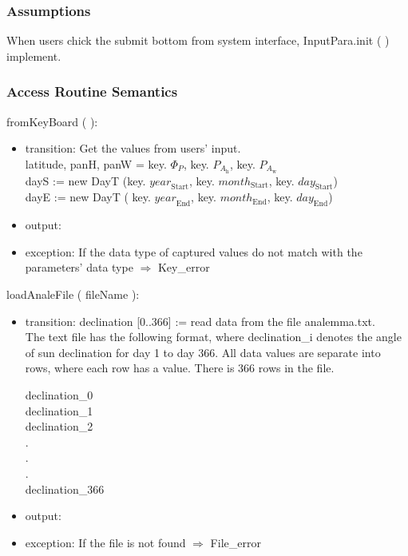 \documentclass[12pt, titlepage]{article}
\begin{document}
\subsubsection{Assumptions}
When users chick the submit bottom from system interface, InputPara.init ( ) implement.

\subsubsection{ Access Routine Semantics}

\noindent  fromKeyBoard ( ):
\begin{itemize}
\item transition: Get the values from users' input.\\
latitude, panH, panW = key. $\Phi_P$, key. $P_{A_{\text{h}}}$, key. $P_{A_{\text{w}}}$\\

dayS := new DayT (key. $\mathit{year}_\text{Start}$, key. $\mathit{month}_\text{Start}$, key. $\mathit{day}_\text{Start}$) \\

dayE :=  new DayT ( key. $\mathit{year}_\text{End}$, key. $\mathit{month}_\text{End}$, key. $\mathit{day}_\text{End}$)\\
\item output:
\item exception: If the data type of captured values do not match with the parameters' data type $\Rightarrow$ Key\_error
\end{itemize}



\noindent  loadAnaleFile ( fileName ):
\begin{itemize}
\item transition: declination [0..366] := read data from the file analemma.txt.\\
The text file has the following format, where declination\_i denotes the angle of sun declination for day 1 to day 366.
All data values are separate into rows, where each row has a value. There is 366 rows in the file.
\begin{center}
declination\_0\\
declination\_1\\
declination\_2\\
.\\
.\\
.\\
declination\_366\\
\end{center}

\item output:
\item exception: If the file is not found $\Rightarrow$ File\_error
\end{itemize}
\end{document}

